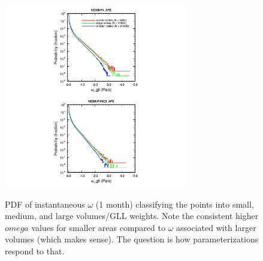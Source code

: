 \documentclass[twocol]{ametsoc}
\begin{document}
\begin{figure}[t]
\noindent\includegraphics[width=19pc,angle=0]{figs/pdf_omg_gll_1panel.pdf}\\
\caption{PDF of instantaneous $\omega$ (1 month) classifying the points into small, medium, and large volumes/GLL 
weights. Note the consistent higher $omega$ values for smaller areas compared to $\omega$ associated with larger volumes (which makes sense). The question is how parameterizations respond to that.}\label{fig:omega-se-volumes}
\end{figure}
\end{document}
